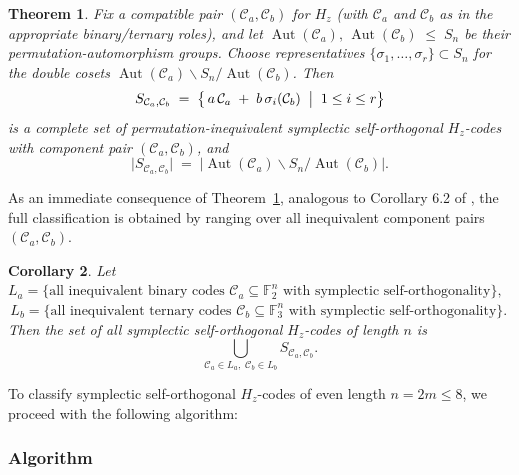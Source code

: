 \documentclass[11pt,a4paper]{article}
\newtheorem{theorem}{Theorem}[section]
\newtheorem{corollary}[theorem]{Corollary}
\theoremstyle{definition}
\numberwithin{equation}{section}
\newcommand{\F}{\mathbb{F}}
\def\C{{\mathcal{C}}}
\begin{document}
\begin{theorem}\label{H23SDR}
Fix a compatible pair \((\C_a,\C_b)\) for \(H_z\) (with \(\C_a\) and \(\C_b\) as in the appropriate binary/ternary roles), and let $\operatorname{Aut}(\C_a),\,\operatorname{Aut}(\C_b)\;\le\;S_n$ be their permutation-automorphism groups.  Choose representatives \(\{\sigma_1,\dots,\sigma_r\}\subset S_n\) for the double cosets \(\operatorname{Aut}(\C_a)\backslash S_n/\operatorname{Aut}(\C_b)\).  Then
\[
S_{\C_a,\C_b}
\;=\;
\bigl\{\,a\,\C_a \;+\; b\,\sigma_i(\C_b)\;\bigm|\;1\le i\le r\bigr\}
\]
is a complete set of permutation-inequivalent symplectic self-orthogonal \(H_z\)-codes with component pair \((\C_a,\C_b)\), and
\[
\bigl|S_{\C_a,\C_b}\bigr|
\;=\;
\bigl|\operatorname{Aut}(\C_a)\backslash S_n/\operatorname{Aut}(\C_b)\bigr|.
\]
\end{theorem}
\noindent As an immediate consequence of Theorem~\ref{H23SDR}, analogous to Corollary 6.2 of \cite{AE}, the full classification is obtained by ranging over all inequivalent component pairs \((\C_a,\C_b)\).
\bigskip
\begin{corollary}
Let $L_a=\{\text{all inequivalent binary codes $\C_a\subseteq\F_2^n$ with symplectic self-orthogonality}\},
$\,  \,$L_b=\{\text{all inequivalent ternary codes $\C_b\subseteq\F_3^n$ with symplectic self-orthogonality}\}.$
Then the set of all symplectic self-orthogonal $H_{z}$-codes of length $n$ is
\[
\bigcup_{\C_a\in L_a,\;\C_b\in L_b}
S_{\C_a,\C_b}.
\]
\end{corollary}
\bigskip

\noindent To classify symplectic self-orthogonal \(H_z\)-codes of even length \(n=2m\le8\), we proceed with the following algorithm:

\subsubsection*{Algorithm}
\end{document}

